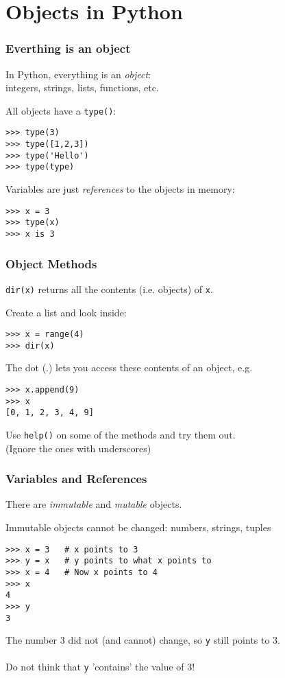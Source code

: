 \documentclass[red]{beamer}
\begin{document}
\section[Objects]{Objects in Python}
\begin{frame}[fragile]
    \frametitle{Everthing is an object}

    In Python, everything is an \emph{object}: \\
        integers, strings, lists, functions, etc.

    All objects have a \lstinline|type()|:
    \begin{lstlisting}
>>> type(3)
>>> type([1,2,3])
>>> type('Hello')
>>> type(type)
    \end{lstlisting}

    Variables are just \emph{references} to the objects in memory:
    \begin{lstlisting}
>>> x = 3
>>> type(x)
>>> x is 3
    \end{lstlisting}
\end{frame}
\begin{frame}[fragile]
    \frametitle{Object Methods}

    \lstinline|dir(x)| returns all the contents (i.e. objects) of \lstinline|x|.

    Create a list and look inside:
    \begin{lstlisting}
>>> x = range(4)
>>> dir(x)
    \end{lstlisting}

    The dot (.) lets you access these contents of an object, e.g.
    \begin{lstlisting}
>>> x.append(9)
>>> x
[0, 1, 2, 3, 4, 9]
    \end{lstlisting}

    Use \lstinline|help()| on some of the methods and try them out.\\
    (Ignore the ones with underscores)

\end{frame}
\begin{frame}[fragile]
    \frametitle{Variables and References}

    There are \textit{immutable} and \textit{mutable} objects.

    Immutable objects cannot be changed: numbers, strings, tuples
    \begin{lstlisting}
>>> x = 3   # x points to 3
>>> y = x   # y points to what x points to
>>> x = 4   # Now x points to 4
>>> x
4
>>> y
3
    \end{lstlisting}
    The number 3 did not (and cannot) change, so \lstinline|y| still points to 3.
    \\~\\
    Do not think that \lstinline|y| 'contains' the value of 3!
\end{frame}
\end{document}
